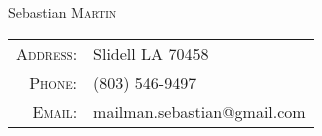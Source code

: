 \documentclass[a4paper,10pt]{article}
\begin{document}
\pagestyle{empty} %

\par{\centering
		{\Huge Sebastian \textsc{Martin}
	}\par}

\begin{center}
	\begin{tabular}{r|l}
    \textsc{Address:}   & Slidell LA 70458\\
    \textsc{Phone:}     & (803) 546-9497\\
    \textsc{Email:}     & {mailman.sebastian@gmail.com}
\end{tabular}
\end{center}



\end{document}

